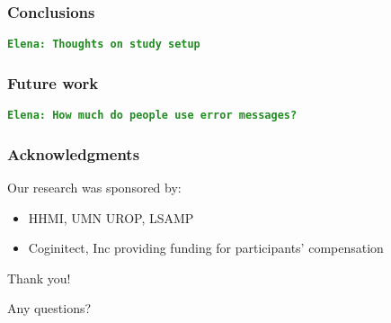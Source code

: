 \documentclass{beamer}
\newcommand{\comment}[1]{{\bf \tt  {#1}}}
\newcommand{\emcomment}[1]{\textcolor{ForestGreen}{\comment{Elena: {#1}}}}
\begin{document}
\begin{frame}
\frametitle{Conclusions}
\emcomment{Thoughts on study setup}
\end{frame}

\begin{frame}
\frametitle{Future work}
\emcomment{How much do people use error messages?}
\end{frame}

\begin{frame}
\frametitle{Acknowledgments}
	Our research was sponsored by:
	\begin{itemize}
	\item HHMI, UMN UROP, LSAMP
        \item Coginitect, Inc providing funding for participants' compensation 
	\end{itemize}
	{\centering
	\noindent
	Thank you! \par
	Any questions? \par
	}
\end{frame}
\end{document}
